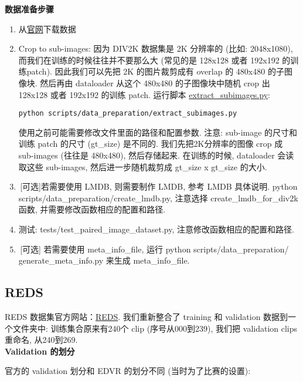 \documentclass[../main.tex]{subfiles}
\begin{document}
\noindent\textbf{数据准备步骤}
\begin{enumerate}
\item 从\href{https://data.vision.ee.ethz.ch/cvl/DIV2K}{官网}下载数据
\item Crop to sub-images: 因为 DIV2K 数据集是 2K 分辨率的 (比如: 2048x1080), 而我们在训练的时候往往并不要那么大 (常见的是 128x128 或者 192x192 的训练patch). 因此我们可以先把 2K 的图片裁剪成有 overlap 的 480x480 的子图像块. 然后再由 dataloader 从这个 480x480 的子图像块中随机 crop 出 128x128 或者 192x192 的训练 patch.
运行脚本 \href{https://github.com/XPixelGroup/BasicSR/blob/master/scripts/data_preparation/extract_subimages.py}{extract\_subimages.py}:
\begin{verbatim}
python scripts/data_preparation/extract_subimages.py
\end{verbatim}
使用之前可能需要修改文件里面的路径和配置参数. 注意: sub-image 的尺寸和训练 patch 的尺寸 (gt\_size) 是不同的. 我们先把2K分辨率的图像 crop 成 sub-images (往往是 480x480), 然后存储起来. 在训练的时候, dataloader 会读取这些 sub-images, 然后进一步随机裁剪成 gt\_size x gt\_size 的大小.
\item\,[可选]若需要使用 LMDB, 则需要制作 LMDB, 参考 LMDB 具体说明. python scripts/data\_preparation/create\_lmdb.py, 注意选择 create\_lmdb\_for\_div2k 函数, 并需要修改函数相应的配置和路径.
\item 测试: tests/test\_paired\_image\_dataset.py, 注意修改函数相应的配置和路径.
\item\,[可选] 若需要使用 meta\_info\_file,
运行 python scripts/data\_preparation/\\generate\_meta\_info.py 来生成 meta\_info\_file.
\end{enumerate}

\subsection{REDS}

REDS 数据集官方网站：\href{https://seungjunnah.github.io/Datasets/reds.html}{REDS}.
我们重新整合了 training 和 validation 数据到一个文件夹中: 训练集合原来有240个 clip (序号从000到239), 我们把 validation clips 重命名, 从240到269.\\

\noindent\textbf{Validation 的划分}

官方的 validation 划分和 EDVR 的划分不同 (当时为了比赛的设置):
\end{document}
